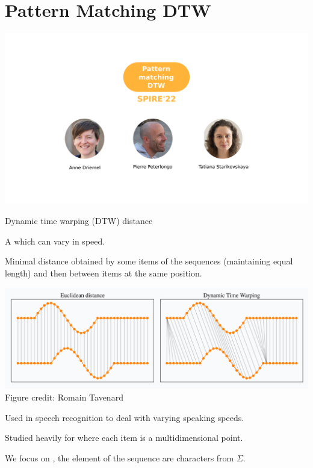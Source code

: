 \section{Pattern Matching DTW}

\newcommand{\dtw}{\mathrm{DTW}}
\newcommand{\ed}{\mathrm{ED}}
\newcommand{\RLE}{\mathrm{RLE}}

\begin{frame}
    \includegraphics[width=\textwidth]{pictures/mindmap/dtw.png}
\end{frame}


\begin{frame}{Dynamic time warping (DTW) distance }

A  which can vary in speed.

 Minimal distance obtained by  some items of the sequences (maintaining equal length) and then  between items at the same position.

\begin{center}
\includegraphics[scale=0.3]{figures/dtw_vs_euc.png}\\
\footnotesize{Figure credit: Romain Tavenard}
\end{center}
\pause
Used in speech recognition to deal with varying speaking speeds.\pause

Studied heavily for  where each item is a multidimensional point.

We focus on , the element of the sequence are characters from $\Sigma$.

\end{frame}

